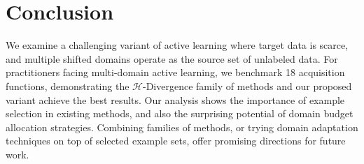 \respace
\respace
\section{Conclusion}
\respace
\label{sec:conclusion}

We examine a challenging variant of active learning where target data is scarce, and multiple shifted domains operate as the source set of unlabeled data.
For practitioners facing multi-domain active learning, we benchmark 18 acquisition functions, demonstrating the $\mathcal{H}$-Divergence family of methods and our proposed variant \dale{} achieve the best results.
Our analysis shows the importance of example selection in existing methods, and also the surprising potential of domain budget allocation strategies.
Combining families of methods, or trying domain adaptation techniques on top of selected example sets, offer promising directions for future work.